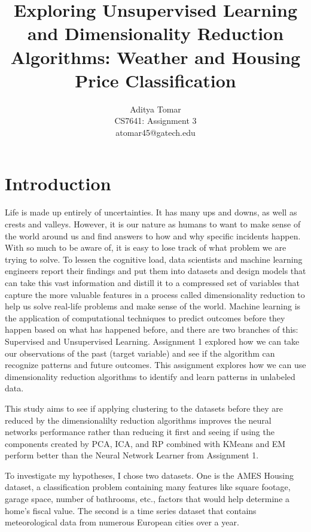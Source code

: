 \documentclass[conference]{IEEEtran}
\title{Exploring Unsupervised Learning and Dimensionality Reduction Algorithms: Weather and Housing Price Classification}
\author{Aditya Tomar \\ CS7641: Assignment 3 \\ atomar45@gatech.edu}
\begin{document}
\maketitle

\begin{abstract}

\end{abstract}

\section{Introduction} Life is made up entirely of uncertainties. It has many ups and downs, as well as crests and valleys. However, it is our nature as humans to want to make sense of the world around us and find answers to how and why specific incidents happen. With so much to be aware of, it is easy to lose track of what problem we are trying to solve. To lessen the cognitive load, data scientists and machine learning engineers report their findings and put them into datasets and design models that can take this vast information and distill it to a compressed set of variables that capture the more valuable features in a process called dimensionality reduction to help us solve real-life problems and make sense of the world. Machine learning is the application of computational techniques to predict outcomes before they happen based on what has happened before, and there are two branches of this: Supervised and Unsupervised Learning. Assignment 1 explored how we can take our observations of the past (target variable) and see if the algorithm can recognize patterns and future outcomes. This assignment explores how we can use dimensionality reduction algorithms to identify and learn patterns in unlabeled data. 
\par This study aims to see if applying clustering to the datasets before they are reduced by the dimensionalilty reduction algorithms improves the neural networks performance rather than reducing it first and seeing if using the components created by PCA, ICA, and RP combined with KMeans and EM perform better than the Neural Network Learner from Assignment 1.
\par To investigate my hypotheses, I chose two datasets. One is the AMES Housing dataset, a classification problem containing many features like square footage, garage space, number of bathrooms, etc., factors that would help determine a home's fiscal value. The second is a time series dataset that contains meteorological data from numerous European cities over a year. 
\end{document}
